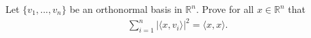 

Let $\{ v_1,...,v_n\}$ be an orthonormal basis in $\mathbb{R}^n$. Prove for all $x \in \mathbb{R}^n$ that
    \begin{align*}
        \sum_{i=1}^n | \langle x, v_i \rangle |^2 = \langle x,x \rangle.
    \end{align*}

\sol{}
